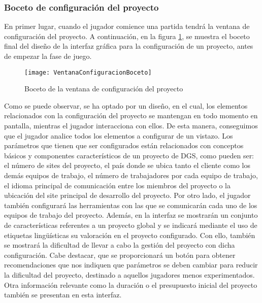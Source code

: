 \subsubsection*{Boceto de configuración del proyecto}
\label{BocetoConfiguracionProyecto}

En primer lugar, cuando el jugador comience una partida tendrá la ventana de configuración del proyecto. A continuación, en la figura \ref{fig:VentanaConfiguracionBoceto}, se muestra el boceto final del diseño de la interfaz gráfica para la configuración de un proyecto, antes de empezar la fase de juego.

\begin{figure}[htb]
	\centering
	\texttt{[image: VentanaConfiguracionBoceto]}
	\caption[Boceto de la ventana de configuración del proyecto]{Boceto de la ventana de configuración del proyecto}
	\label{fig:VentanaConfiguracionBoceto}
\end{figure}

Como se puede observar, se ha optado por un diseño, en el cual, los elementos relacionados con la configuración del proyecto se mantengan en todo momento en pantalla, mientras el jugador interacciona con ellos. De esta manera, conseguimos que el jugador analice todos los elementos a configurar de un vistazo. Los parámetros que tienen que ser configurados están relacionados con conceptos básicos y componentes característicos de un proyecto de DGS, como pueden ser: el número de sites del proyecto, el país donde se ubica tanto el cliente como los demás equipos de trabajo, el número de trabajadores por cada equipo de trabajo, el idioma principal de comunicación entre los miembros del proyecto o la ubicación del site principal de desarrollo del proyecto. Por otro lado, el jugador también configurará las herramientas con las que se comunicarán cada uno de los equipos de trabajo del proyecto. Además, en la interfaz se mostrarán un conjunto de características referentes a un proyecto global y se indicará mediante el uso de etiquetas lingüísticas su valoración en el proyecto configurado. Con ello, también se mostrará la dificultad de llevar a cabo la gestión del proyecto con dicha configuración. Cabe destacar, que se proporcionará un botón para obtener recomendaciones que nos indiquen que parámetros se deben cambiar para reducir la dificultad del proyecto, destinado a aquellos jugadores menos experimentados. Otra información relevante como la duración o el presupuesto inicial del proyecto también se presentan en esta interfaz.

